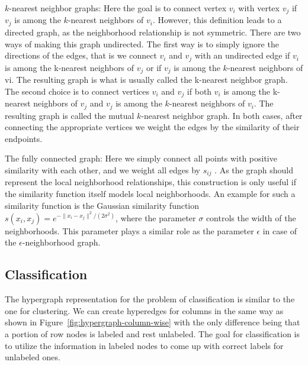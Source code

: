 $k$-nearest neighbor graphs: Here the goal is to connect vertex $v_i$ with vertex $v_j$ if $v_j$ is among the $k$-nearest neighbors of $v_i$. However, this definition leads to a directed graph, as the neighborhood relationship is not symmetric. There are two ways of making this graph undirected. The first way is to simply ignore the directions of the edges, that is we connect $v_i$ and $v_j$ with an undirected edge if $v_i$ is among the k-nearest neighbors of $v_j$ or if $v_j$ is among the $k$-nearest neighbors of vi. The resulting graph is what is usually called the k-nearest neighbor graph. The second choice is to connect vertices $v_i$ and $v_j$ if both $v_i$ is among the k-nearest neighbors of $v_j$ and $v_j$ is among the $k$-nearest neighbors of $v_i$. The resulting graph is called the mutual $k$-nearest neighbor graph. In both cases, after connecting the appropriate vertices we weight the edges by the similarity of their endpoints.

The fully connected graph: Here we simply connect all points with positive similarity with each other, and we weight all edges by $s_{ij}$ . As the graph should represent the local neighborhood relationships, this construction is only useful if the similarity function itself models local neighborhoods. An example for such a similarity function is the Gaussian similarity function $s(x_i, x_j) = e^{-\|x_i - x_j\|^2/(2\sigma^2)}$, where the parameter $\sigma$ controls the width of the neighborhoods. This parameter plays a similar role as the parameter $\epsilon$ in case of the $\epsilon$-neighborhood graph.


\subsection{Classification}
\label{sec:classification}
The hypergraph representation for the problem of classification is similar to the one for clustering. We can create hyperedges for columns in the same way as shown in Figure~\ref{fig:hypergraph-column-wise} with the only difference being that a portion of row nodes is labeled and rest unlabeled. The goal for classification is to utilize the information in labeled nodes to come up with correct labels for unlabeled ones.


